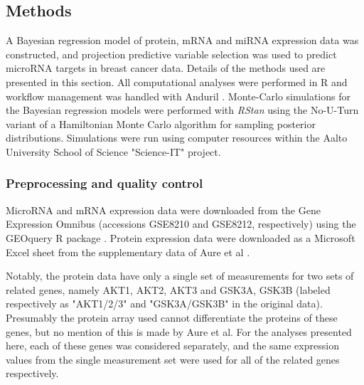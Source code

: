 





\subsection{Methods}

A Bayesian regression model of protein, mRNA and miRNA expression data was
constructed, and projection predictive variable selection was used to predict
microRNA targets in breast cancer data. Details of the methods used are
presented in this section. All computational analyses were performed in R
\citep{R} and workflow management was handled with Anduril \citep{Ovaska2010}.
Monte-Carlo simulations for the Bayesian regression models were performed with
\emph{RStan} \citep{RStan} using the No-U-Turn variant of a Hamiltonian Monte Carlo
algorithm for sampling posterior distributions. Simulations were run using
computer resources within the Aalto University School of Science "Science-IT"
project.


\subsubsection{Preprocessing and quality control}

MicroRNA and mRNA expression data were downloaded from the Gene Expression
Omnibus \citep{Edgar2002} (accessions GSE8210 and GSE8212, respectively) using
the GEOquery R package \citep{GEOquery}. Protein expression data were
downloaded as a Microsoft Excel sheet from the supplementary data of Aure et
al \citep{Aure2015}.

Notably, the protein data have only a single set of measurements for two sets
of related genes, namely AKT1, AKT2, AKT3 and GSK3A, GSK3B (labeled
respectively as "AKT1/2/3" and "GSK3A/GSK3B" in the original data). Presumably
the protein array used cannot differentiate the proteins of these genes, but
no mention of this is made by Aure et al. For the analyses presented here,
each of these genes was considered separately, and the same expression values
from the single measurement set were used for all of the related genes
respectively.

